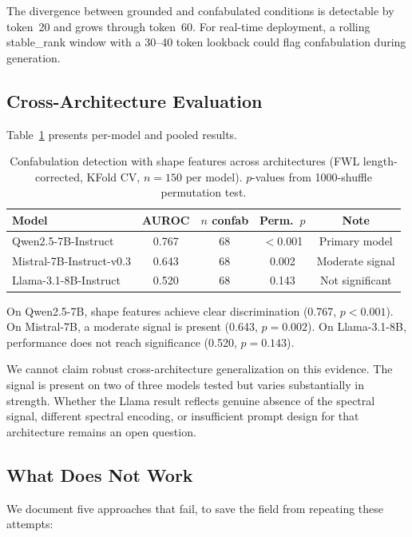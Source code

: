 \documentclass[11pt,a4paper]{article}
\begin{document}
The divergence between grounded and confabulated conditions is
detectable by token~20 and grows through token~60. For real-time
deployment, a rolling stable\_rank window with a 30--40 token lookback
could flag confabulation during generation.

\subsection{Cross-Architecture Evaluation}

Table~\ref{tab:crossarch} presents per-model and pooled results.

\begin{table}[h]
\centering
\caption{Confabulation detection with shape features across
  architectures (FWL length-corrected, KFold CV, $n=150$ per
  model). $p$-values from 1000-shuffle permutation test.}
\label{tab:crossarch}
\begin{tabular}{lcccc}
\toprule
\textbf{Model} & \textbf{AUROC} & \textbf{$n$ confab} & \textbf{Perm.\ $p$} & \textbf{Note} \\
\midrule
Qwen2.5-7B-Instruct & 0.767 & 68 & $<$0.001 & Primary model \\
Mistral-7B-Instruct-v0.3 & 0.643 & 68 & 0.002 & Moderate signal \\
Llama-3.1-8B-Instruct & 0.520 & 68 & 0.143 & Not significant \\
\bottomrule
\end{tabular}
\end{table}

On Qwen2.5-7B, shape features achieve clear discrimination (0.767,
$p < 0.001$). On Mistral-7B, a moderate signal is present (0.643,
$p = 0.002$). On Llama-3.1-8B, performance does not reach significance
(0.520, $p = 0.143$).

We cannot claim robust cross-architecture generalization on this
evidence. The signal is present on two of three models tested but
varies substantially in strength. Whether the Llama result reflects
genuine absence of the spectral signal, different spectral encoding,
or insufficient prompt design for that architecture remains an open
question.

\subsection{What Does Not Work}

We document five approaches that fail, to save the field from
repeating these attempts:
\end{document}
